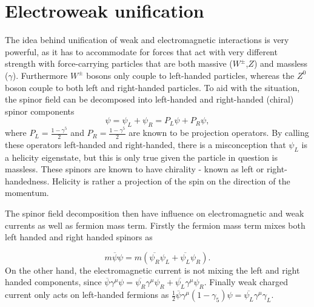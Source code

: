 \section{Electroweak unification}
\label{weak}
The idea behind unification of weak and electromagnetic interactions is very powerful, as it has to accommodate for forces that act with very different strength with force-carrying particles that are both massive ($W^{\pm}$,$Z$) and massless ($\gamma$). Furthermore $W^{\pm}$ bosons only couple to left-handed particles, whereas the $Z^{0}$ boson couple to both left and right-handed particles. 
To aid with the situation, the spinor field can be decomposed into left-handed and right-handed (chiral) spinor components
\begin{equation}
	\psi=\psi_{L}+\psi_{R} = P_{L}\psi + P_{R}\psi,
\end{equation}
where $P_{L} =\frac{1-\gamma^{5}}{2}$ and $P_{R}=\frac{1-\gamma^{5}}{2}$ are known to be projection operators. By calling these operators left-handed and right-handed, there is a misconception that $\psi_{L}$ is a helicity eigenstate, but this is only true given the particle in question is massless. These spinors are known to have chirality - known as left or right-handedness. Helicity is rather a projection of the spin on the direction of the momentum.

The spinor field decomposition then have influence on electromagnetic and weak currents as well as fermion mass term. Firstly the fermion mass term mixes both left handed and right handed spinors as 

\begin{equation}
	m\overline{\psi}\psi=m(\overline{\psi_{R}}\psi_{L} + \overline{\psi_{L}}\psi_{R}).
\label{eq:mixingpsi}
\end{equation}	
On the other hand, the electromagnetic current is not mixing the left and right handed components, since $\overline{\psi}\gamma^{\mu}\psi=\overline{\psi_{R}}\gamma^{\mu}\psi_{R} + \overline{\psi_{L}}\gamma^{\mu}\psi_{R}$. Finally weak charged current only acts on left-handed fermions as $\frac{1}{2}\overline{\psi}\gamma^{\mu}(1-\gamma_{5})\psi = \overline{\psi_{L}}\gamma^{\mu}\gamma_{L}$.   


